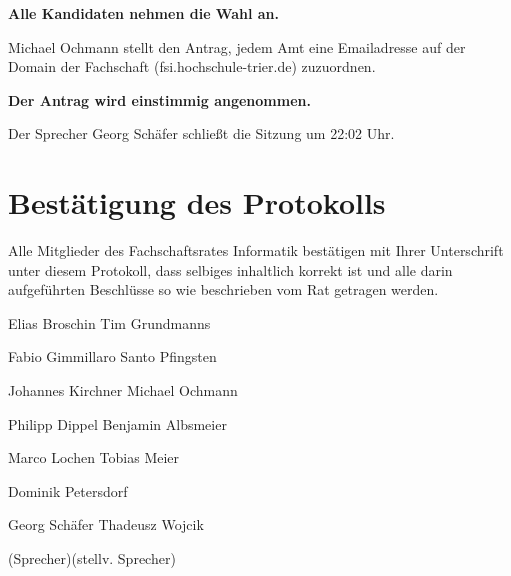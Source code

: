\documentclass[a4paper, 11pt]{article} %
\begin{document}
\begin{center}
	\textbf{Alle Kandidaten nehmen die Wahl an.}
\end{center}
Michael Ochmann stellt den Antrag, jedem Amt eine Emailadresse auf der Domain der Fachschaft (fsi.hochschule-trier.de) zuzuordnen.
\begin{center}
	\textbf{Der Antrag wird einstimmig angenommen.}
\end{center}
Der Sprecher Georg Schäfer schließt die Sitzung um 22:02 Uhr.

\pagebreak
\section{Bestätigung des Protokolls}
Alle Mitglieder des Fachschaftsrates Informatik bestätigen mit Ihrer Unterschrift unter diesem Protokoll, dass selbiges inhaltlich korrekt ist und alle darin aufgeführten Beschlüsse so wie beschrieben vom Rat getragen werden.
\\
\vspace{1.5cm}

\hrulefill \hfill \hrulefill

Elias Broschin \hfill Tim Grundmanns

\vspace{2.0cm}
\hrulefill \hfill \hrulefill

Fabio Gimmillaro \hfill Santo Pfingsten

\vspace{2.0cm}
\hrulefill \hfill \hrulefill

Johannes Kirchner \hfill Michael Ochmann

\pagebreak
\vspace{2.0cm}
\hrulefill \hfill \hrulefill

Philipp Dippel \hfill Benjamin Albsmeier

\vspace{2.0cm}
\hrulefill \hfill \hrulefill

Marco Lochen \hfill Tobias Meier

\vspace{2.0cm}
\hrulefill \hfill \hfill \hfill

Dominik Petersdorf \hfill \hfill

\vspace{3.5cm}
\hrulefill \hfill \hrulefill

Georg Schäfer \hfill Thadeusz Wojcik

{\footnotesize (Sprecher)\hfill (stellv. Sprecher)}
\end{document}
